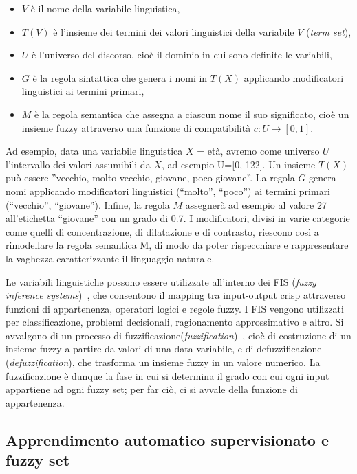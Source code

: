 \documentclass[11pt,  oneside, openany]{book}
\begin{document}
\begin{itemize}
\item $V$ è il nome della variabile linguistica, 
\item $T(V)$ è l'insieme dei termini dei valori linguistici della variabile $V$ (\textit{term set}), 
\item $U$ è l'universo del discorso, cioè il dominio in cui sono definite le variabili, 
\item $G$ è la regola sintattica che genera i nomi in $T(X)$ applicando modificatori linguistici ai termini primari, 
\item $M$ è la regola semantica che assegna a ciascun nome il suo significato, cioè un insieme fuzzy attraverso una funzione di compatibilità $c : U \to [0,1]$. 
\end{itemize}

Ad esempio, data una variabile linguistica $X$ = età, avremo come universo $U$ l'intervallo dei valori assumibili da $X$, ad esempio U=[0, 122]. Un insieme $T(X)$ può essere ''vecchio, molto vecchio, giovane, poco giovane''. La regola $G$ genera nomi applicando modificatori linguistici (``molto'', ``poco'') ai termini primari (``vecchio'', ``giovane''). Infine, la regola $M$ assegnerà ad esempio al valore 27 all'etichetta ``giovane'' con un grado di 0.7. I modificatori, divisi in varie categorie come quelli di concentrazione, di dilatazione e di contrasto, riescono così a rimodellare la regola semantica M, di modo da poter rispecchiare e rappresentare la vaghezza caratterizzante il linguaggio naturale. 

Le variabili linguistiche possono essere utilizzate all'interno dei FIS (\textit{fuzzy inference systems})~\cite{fis}, che consentono il mapping tra input-output crisp attraverso funzioni di appartenenza, operatori logici e regole fuzzy. I FIS vengono utilizzati per classificazione, problemi decisionali, ragionamento approssimativo e altro. Si avvalgono di un processo di fuzzificazione(\textit{fuzzification})~\cite{fuzzific}, cioè di costruzione di un insieme fuzzy a partire da valori di una data variabile, e di defuzzificazione (\textit{defuzzification}), che trasforma un insieme fuzzy in un valore numerico. La fuzzificazione è dunque la fase in cui si determina il grado con cui ogni input appartiene ad ogni fuzzy set; per far ciò, ci si avvale della funzione di appartenenza. 

\subsection{Apprendimento automatico supervisionato e fuzzy set}
\end{document}
